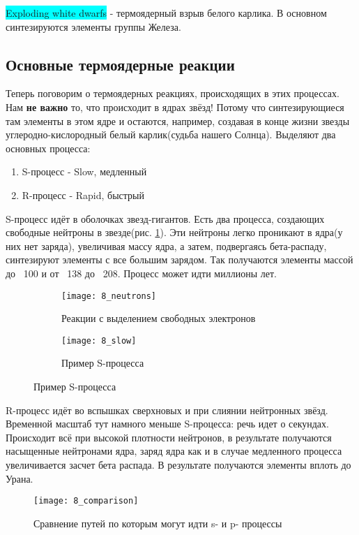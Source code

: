 \colorbox{Cyan}{Exploding white dwarfs} - термоядерный взрыв белого карлика. В основном синтезируются элементы группы Железа.

\subsection{Основные термоядерные реакции}

Теперь поговорим о термоядерных реакциях, происходящих в этих процессах. Нам \textbf{не важно} то, что происходит в ядрах звёзд! Потому что синтезирующиеся там элементы в этом ядре и остаются, например, создавая в конце жизни звезды углеродно-кислородный белый карлик(судьба нашего Солнца). Выделяют два основных процесса:

\begin{enumerate}
	\item S-процесс - Slow, медленный
	\item R-процесс - Rapid, быстрый
\end{enumerate}

S-процесс идёт в оболочках звезд-гигантов. Есть два процесса, создающих свободные нейтроны в звезде(рис. \ref{fig:8_neutrons}). Эти нейтроны легко проникают в ядра(у них нет заряда), увеличивая массу ядра, а затем, подвергаясь бета-распаду, синтезируют элементы с все большим зарядом. Так получаются элементы массой до ~100 и от ~138 до ~208. Процесс может идти миллионы лет.

\begin{figure}[H]
	\begin{subfigure}
		\centering
		\texttt{[image: 8\_neutrons]}
		\caption{Реакции с выделением свободных электронов}
		\label{fig:8_neutrons}
	\end{subfigure}
	
	\begin{subfigure}
		\centering
		\texttt{[image: 8\_slow]}
		\caption{Пример S-процесса}
		\label{fig:8_slow}
	\end{subfigure}

	\label{fig:8_s_process}
\end{figure}

R-процесс идёт во вспышках сверхновых и при слиянии нейтронных звёзд. Временной масштаб тут намного меньше S-процесса: речь идет о секундах. Происходит всё при высокой плотности нейтронов, в результате получаются насыщенные нейтронами ядра, заряд ядра как и в случае медленного процесса увеличивается засчет бета распада. В результате получаются элементы вплоть до Урана.

\begin{figure}[H]
	\centering
	\texttt{[image: 8\_comparison]}
	\caption{Сравнение путей по которым могут идти s- и p- процессы}
	\label{fig:8_comparison}
\end{figure}
